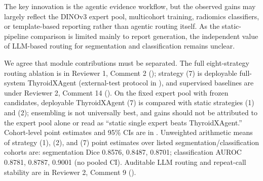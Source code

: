 \begin{reviewercomment}
The key innovation is the agentic evidence workflow, but the observed gains may largely reflect the DINOv3 expert pool, multicohort training, radiomics classifiers, or template-based reporting rather than agentic routing itself. As the static-pipeline comparison is limited mainly to report generation, the independent value of LLM-based routing for segmentation and classification remains unclear.
\end{reviewercomment}
\begin{authorresponse}
We agree that module contributions must be separated. The full eight-strategy routing ablation is in Reviewer 1, Comment 2 (); strategy (7) is deployable full-system ThyroidXAgent (external-test protocol in ), and supervised baselines are under Reviewer 2, Comment 14 (). On the fixed expert pool with frozen candidates, deployable ThyroidXAgent (7) is compared with static strategies (1) and (2); ensembling is not universally best, and gains should not be attributed to the expert pool alone or read as ``static single expert beats ThyroidXAgent.'' Cohort-level point estimates and 95\% CIs are in . Unweighted arithmetic means of strategy (1), (2), and (7) point estimates over listed segmentation/classification cohorts are: segmentation Dice 0.8576, 0.8487, 0.8701; classification AUROC 0.8781, 0.8787, 0.9001 (no pooled CI). Auditable LLM routing and repeat-call stability are in Reviewer 2, Comment 9 ().
\par
\end{authorresponse}

